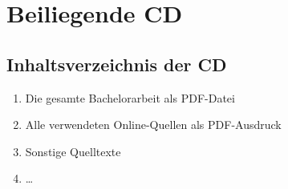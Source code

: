 
\section{Beiliegende CD}
\label{sec:BeiliegendeCd}

\subsection{Inhaltsverzeichnis der CD}
\label{subsec:InhaltsverzeichnisCd}

\begin{enumerate}
	\item Die gesamte Bachelorarbeit als PDF-Datei
	\item Alle verwendeten Online-Quellen als PDF-Ausdruck
	\item Sonstige Quelltexte
	\item \ldots
\end{enumerate}